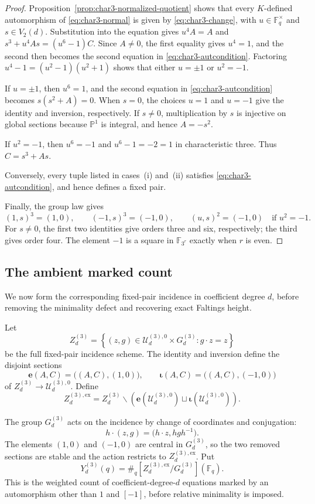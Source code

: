\documentclass[a4paper,12pt]{amsart}
\theoremstyle{definition}
\newcommand{\cU}{\mathcal{U}}
\newcommand{\Fb}{\mathbb{F}}
\newcommand{\Pb}{\mathbb{P}}
\renewcommand{\setminus}{\smallsetminus}
\begin{document}
\begin{proof}
Proposition~\ref{prop:char3-normalized-quotient} shows that every $K$-defined automorphism of \eqref{eq:char3-normal} is given by \eqref{eq:char3-change}, with $u\in\Fb_q^\times$ and $s\in V_2(d)$. Substitution into the equation gives $u^4A=A$ and $s^3+u^4As=(u^6-1)C$.  Since $A\neq0$, the first equality gives $u^4=1$, and the second then becomes the second equation in \eqref{eq:char3-autcondition}.  Factoring $u^4-1=(u^2-1)(u^2+1)$ shows that either $u=\pm1$ or $u^2=-1$.

If $u=\pm1$, then $u^6=1$, and the second equation in \eqref{eq:char3-autcondition} becomes $s(s^2+A)=0$.  When $s=0$, the choices $u=1$ and $u=-1$ give the identity and inversion, respectively. If $s\neq0$, multiplication by $s$ is injective on global sections because $\Pb^1$ is integral, and hence $A=-s^2$.

If $u^2=-1$, then $u^6=-1$ and $u^6-1=-2=1$ in characteristic three. Thus $C=s^3+As$.

Conversely, every tuple listed in cases~\textup{(i)} and~\textup{(ii)} satisfies \eqref{eq:char3-autcondition}, and hence defines a fixed pair.

Finally, the group law gives
\[
(1,s)^3=(1,0),
\qquad
(-1,s)^3=(-1,0),
\qquad
(u,s)^2=(-1,0)\quad\text{if }u^2=-1.
\]
For $s\neq0$, the first two identities give orders three and six, respectively; the third gives order four.  The element $-1$ is a square in $\Fb_{3^r}$ exactly when $r$ is even.
\end{proof}

\subsection{The ambient marked count}

We now form the corresponding fixed-pair incidence in coefficient degree $d$, before removing the minimality defect and recovering exact Faltings height.

Let
\[
Z_d^{(3)}
=
\left\{
(z,g)\in\cU_d^{(3),0}\times G_d^{(3)}:
g\cdot z=z
\right\}
\]
be the full fixed-pair incidence scheme.  The identity and inversion define the disjoint sections
\[
\mathbf e(A,C)=\bigl((A,C),(1,0)\bigr),
\qquad
\boldsymbol\iota(A,C)=\bigl((A,C),(-1,0)\bigr)
\]
of $Z_d^{(3)}\to\cU_d^{(3),0}$.  Define
\[
Z_d^{(3),\mathrm{ex}}
=
Z_d^{(3)}\setminus
\left(
\mathbf e(\cU_d^{(3),0})
\sqcup
\boldsymbol\iota(\cU_d^{(3),0})
\right).
\]

The group $G_d^{(3)}$ acts on the incidence by change of coordinates and conjugation:
\[
h\cdot(z,g)=\bigl(h\cdot z,hgh^{-1}\bigr).
\]
The elements $(1,0)$ and $(-1,0)$ are central in $G_d^{(3)}$, so the two removed sections are stable and the action restricts to $Z_d^{(3),\mathrm{ex}}$.  Put
\[
Y_d^{(3)}(q)
=
\#_q[Z_d^{(3),\mathrm{ex}}/G_d^{(3)}](\Fb_q).
\]
This is the weighted count of coefficient-degree-$d$ equations marked by an automorphism other than $1$ and $[-1]$, before relative minimality is imposed.
\end{document}
